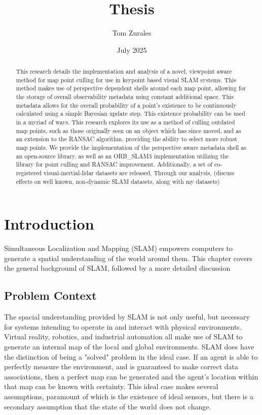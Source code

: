 \documentclass[12pt]{article}
\title{Thesis}
\author{Tom Zurales}
\date{July 2025}
\begin{document}
\doublespace

\maketitle

\begin{abstract}
  This research details the implementation and analysis of a novel, viewpoint aware method for map point culling for use in keypoint based visual SLAM systems. This method makes use of perspective dependent shells around each map point, allowing for the storage of overall observability metadata using constant additional space. This metadata allows for the overall probability of a point's existence to be continuously calculated using a simple Bayesian update step. This existence probability can be used in a myriad of ways. This research explores its use as a method of culling outdated map points, such as those originally seen on an object which has since moved, and as an extension to the RANSAC algorithm, providing the ability to select more robust map points. We provide the implementation of the perspective aware metadata shell as an open-source library, as well as an ORB\_SLAM3 implementation utilizing the library for point culling and RANSAC improvement. Additionally, a set of co-registered visual-inertial-lidar datasets are released,  Through our analysis, (discuss effects on well known, non-dynamic SLAM datasets, along with my datasets)
\end{abstract}

\section{Introduction}

Simultaneous Localization and Mapping (SLAM) empowers computers to generate a spatial understanding of the world around them. This chapter covers the general background of SLAM, followed by a more detailed discussion

\subsection{Problem Context}

The spacial understanding provided by SLAM is not only useful, but necessary for systems intending to operate in and interact with physical environments. Virtual reality, robotics, and industrial automation all make use of SLAM to generate an internal map of the local and global environments. SLAM does have the distinction of being a "solved" problem in the ideal case. If an agent is able to perfectly measure the environment, and is guaranteed to make correct data associations, then a perfect map can be generated and the agent's location within that map can be known with certainty. This ideal case makes several assumptions, paramount of which is the existence of ideal sensors, but there is a secondary assumption that the state of the world does not change.
\end{document}
